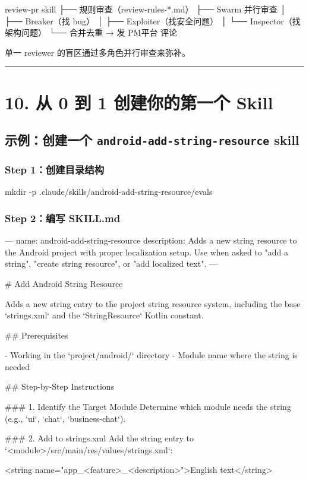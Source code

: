 \begin{codeblock}
review-pr skill
  ├── 规则审查（review-rules-*.md）
  ├── Swarm 并行审查
  │   ├── Breaker（找 bug）
  │   ├── Exploiter（找安全问题）
  │   └── Inspector（找架构问题）
  └── 合并去重 → 发 PM平台 评论
\end{codeblock}

单一 reviewer 的盲区通过多角色并行审查来弥补。


\bigskip\hrule\bigskip

\section{10. 从 0 到 1 创建你的第一个 Skill}

\subsection{示例：创建一个 \texttt{android-add-string-resource} skill}

\subsubsection{Step 1：创建目录结构}

\begin{codeblock}
mkdir -p .claude/skills/android-add-string-resource/evals
\end{codeblock}

\subsubsection{Step 2：编写 SKILL.md}

\begin{codeblock}
---
name: android-add-string-resource
description: Adds a new string resource to the Android project with
             proper localization setup. Use when asked to "add a string",
             "create string resource", or "add localized text".
---

# Add Android String Resource

Adds a new string entry to the project string resource system, including
the base `strings.xml` and the `StringResource` Kotlin constant.

## Prerequisites

- Working in the `project/android/` directory
- Module name where the string is needed

## Step-by-Step Instructions

### 1. Identify the Target Module
Determine which module needs the string (e.g., `ui`, `chat`, `business-chat`).

### 2. Add to strings.xml
Add the string entry to `<module>/src/main/res/values/strings.xml`:
\end{codeblock}
<string name="app\_<feature>\_<description>">English text</string>

